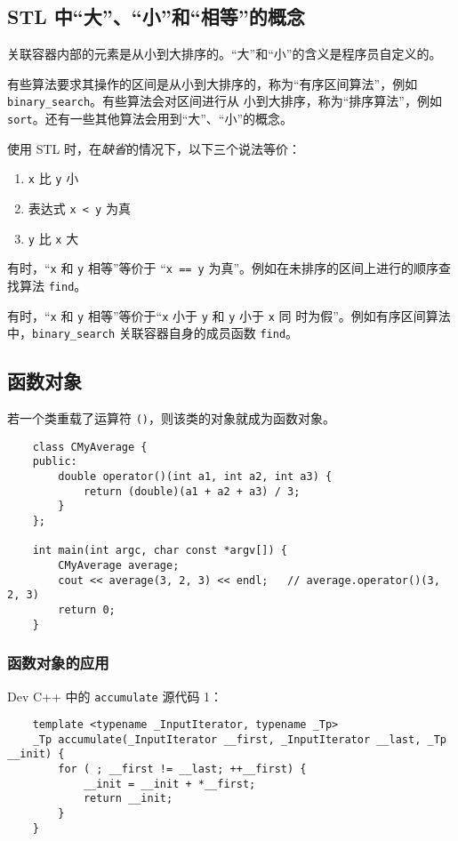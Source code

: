 \documentclass[UTF8]{ctexart}
\begin{document}
\subsection{STL 中“大”、“小”和“相等”的概念}
关联容器内部的元素是从小到大排序的。“大”和“小”的含义是程序员自定义的。

有些算法要求其操作的区间是从小到大排序的，称为“有序区间算法”，例如 \texttt{binary\_search}。有些算法会对区间进行从
小到大排序，称为“排序算法”，例如 \texttt{sort}。还有一些其他算法会用到“大”、“小”的概念。

使用 STL 时，在\emph{缺省}的情况下，以下三个说法等价：
\begin{enumerate}
    \item \texttt{x} 比 \texttt{y} 小
    \item 表达式 \texttt{x < y} 为真
    \item \texttt{y} 比 \texttt{x} 大
\end{enumerate}

有时，“\texttt{x} 和 \texttt{y} 相等”等价于 “\texttt{x == y} 为真”。例如在未排序的区间上进行的顺序查找算法
\texttt{find}。

有时，“\texttt{x} 和 \texttt{y} 相等”等价于“\texttt{x} 小于 \texttt{y} 和 \texttt{y} 小于 \texttt{x} 同
时为假”。例如有序区间算法中，\texttt{binary\_search} 关联容器自身的成员函数 \texttt{find}。

\subsection{函数对象}
若一个类重载了运算符 \texttt{()}，则该类的对象就成为函数对象。
\begin{verbatim}
    class CMyAverage {
    public:
        double operator()(int a1, int a2, int a3) {
            return (double)(a1 + a2 + a3) / 3;
        }
    };

    int main(int argc, char const *argv[]) {
        CMyAverage average;
        cout << average(3, 2, 3) << endl;   // average.operator()(3, 2, 3)
        return 0;
    }
\end{verbatim}

\subsubsection{函数对象的应用}
Dev C++ 中的 \texttt{accumulate} 源代码 1：
\begin{verbatim}
    template <typename _InputIterator, typename _Tp>
    _Tp accumulate(_InputIterator __first, _InputIterator __last, _Tp __init) {
        for ( ; __first != __last; ++__first) {
            __init = __init + *__first;
            return __init;
        }
    }
\end{verbatim}
\end{document}
